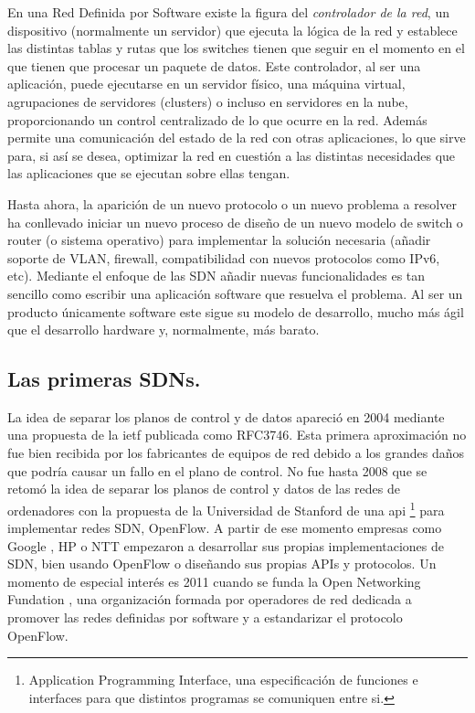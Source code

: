En una Red Definida por Software existe la figura del \emph{controlador de la red}, un dispositivo (normalmente un servidor) que ejecuta la lógica de la red y establece las distintas tablas y rutas que los switches tienen que seguir en el momento en el que tienen que procesar un paquete de datos. Este controlador, al ser una aplicación, puede ejecutarse en un servidor físico, una máquina virtual, agrupaciones de servidores (clusters) o incluso en servidores en la nube, proporcionando un control centralizado de lo que ocurre en la red. Además permite una comunicación del estado de la red con otras aplicaciones, lo que sirve para, si así se desea, optimizar la red en cuestión a las distintas necesidades que las aplicaciones que se ejecutan sobre ellas tengan.

Hasta ahora, la aparición de un nuevo protocolo o un nuevo problema a resolver ha conllevado iniciar un nuevo proceso de diseño de un nuevo modelo de switch o router (o sistema operativo) para implementar la solución necesaria (añadir soporte de VLAN, firewall, compatibilidad con nuevos protocolos como IPv6, etc). Mediante el enfoque de las SDN añadir nuevas funcionalidades es tan sencillo como escribir una aplicación software que resuelva el problema. Al ser un producto únicamente software este sigue su modelo de desarrollo, mucho más ágil que el desarrollo hardware y, normalmente, más barato.


\subsection{Las primeras SDNs.}

La idea de separar los planos de control y de datos apareció en 2004 mediante una propuesta de la \acrshort{ietf} publicada como RFC3746\cite{rfc3746}. Esta primera aproximación no fue bien recibida por los fabricantes de equipos de red debido a los grandes daños que podría causar un fallo en el plano de control. No fue hasta 2008 que se retomó la idea de separar los planos de control y datos de las redes de ordenadores con la propuesta de la Universidad de Stanford \cite{openflowstanford} de una \acrshort{api} \footnote{Application Programming Interface, una especificación de funciones e interfaces para que distintos programas se comuniquen entre si.} para implementar redes SDN, OpenFlow. A partir de ese momento empresas como Google \cite{hoelzlet78:online}, HP o NTT empezaron a desarrollar sus propias implementaciones de SDN, bien usando OpenFlow o diseñando sus propias APIs y protocolos. Un momento de especial interés es 2011 cuando se funda la Open Networking Fundation \cite{OpenNetw57:online}, una organización formada por operadores de red dedicada a promover las redes definidas por software y a estandarizar el protocolo OpenFlow. 

